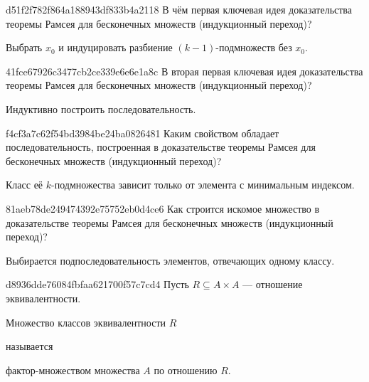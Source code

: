 \begin{note}{d51f2f782f864a188943df833b4a2118}
    В чём первая ключевая идея доказательства теоремы Рамсея для бесконечных множеств (индукционный переход)?

    \begin{cloze}{1}
        Выбрать \({ x_0 }\) и индуцировать разбиение \({ (k-1) }\)-под\-мно\-жеств без \({ x_0 }\).
    \end{cloze}
\end{note}

\begin{note}{41fce67926c3477cb2ce339e6e6e1a8c}
    В вторая первая ключевая идея доказательства теоремы Рамсея для бесконечных множеств (индукционный переход)?

    \begin{cloze}{1}
        Индуктивно построить последовательность.
    \end{cloze}
\end{note}

\begin{note}{f4cf3a7c62f54bd3984be24ba0826481}
    Каким свойством обладает последовательность, построенная в доказательстве теоремы Рамсея для бесконечных множеств (индукционный переход)?

    \begin{cloze}{1}
        Класс её \({ k }\)-подмножества зависит только от элемента с минимальным индексом.
    \end{cloze}
\end{note}

\begin{note}{81aeb78de249474392e75752eb0d4ce6}
    Как строится искомое множество в доказательстве теоремы Рамсея для бесконечных множеств (индукционный переход)?

    \begin{cloze}{1}
        Выбирается подпоследовательность элементов, отвечающих одному классу.
    \end{cloze}
\end{note}

\begin{note}{d8936dde76084fbfaa621700f57c7cd4}
    Пусть \({ R \subseteq A \times A }\) --- отношение эквивалентности.
    \begin{icloze}{2}Множество классов эквивалентности \({ R }\)\end{icloze} называется \begin{icloze}{1}фактор-мно\-же\-ством множества \({ A }\) по отношению \({ R }\).\end{icloze}
\end{note}

